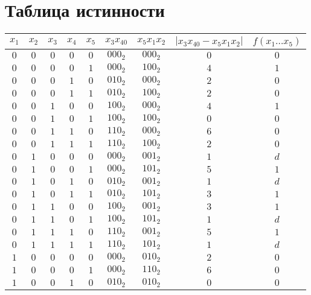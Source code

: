 \documentclass[12pt,a4paper]{report}
\begin{document}
\section*{Таблица истинности}
\begin{tabular}{|ccccc|c|c|c|c|}
    \hline
    $x_1$ & $x_2$ & $x_3$ & $x_4$ & $x_5$ & $x_3x_40$ & $x_5x_1x_2$ & $|x_3x_40-x_5x_1x_2|$ & $f(x_1\dots x_5)$\\
    \hline
    $0$ & $0$ & $0$ & $0$ & $0$ & $000_2$ & $000_2$ & $0$ & $0$\\
    \hline
    $0$ & $0$ & $0$ & $0$ & $1$ & $000_2$ & $100_2$ & $4$ & $1$\\
    \hline
    $0$ & $0$ & $0$ & $1$ & $0$ & $010_2$ & $000_2$ & $2$ & $0$\\
    \hline
    $0$ & $0$ & $0$ & $1$ & $1$ & $010_2$ & $100_2$ & $2$ & $0$\\
    \hline
    $0$ & $0$ & $1$ & $0$ & $0$ & $100_2$ & $000_2$ & $4$ & $1$\\
    \hline
    $0$ & $0$ & $1$ & $0$ & $1$ & $100_2$ & $100_2$ & $0$ & $0$\\
    \hline
    $0$ & $0$ & $1$ & $1$ & $0$ & $110_2$ & $000_2$ & $6$ & $0$\\
    \hline
    $0$ & $0$ & $1$ & $1$ & $1$ & $110_2$ & $100_2$ & $2$ & $0$\\
    \hline
    $0$ & $1$ & $0$ & $0$ & $0$ & $000_2$ & $001_2$ & $1$ & $d$\\
    \hline
    $0$ & $1$ & $0$ & $0$ & $1$ & $000_2$ & $101_2$ & $5$ & $1$\\
    \hline
    $0$ & $1$ & $0$ & $1$ & $0$ & $010_2$ & $001_2$ & $1$ & $d$\\
    \hline
    $0$ & $1$ & $0$ & $1$ & $1$ & $010_2$ & $101_2$ & $3$ & $1$\\
    \hline
    $0$ & $1$ & $1$ & $0$ & $0$ & $100_2$ & $001_2$ & $3$ & $1$\\
    \hline
    $0$ & $1$ & $1$ & $0$ & $1$ & $100_2$ & $101_2$ & $1$ & $d$\\
    \hline
    $0$ & $1$ & $1$ & $1$ & $0$ & $110_2$ & $001_2$ & $5$ & $1$\\
    \hline
    $0$ & $1$ & $1$ & $1$ & $1$ & $110_2$ & $101_2$ & $1$ & $d$\\
    \hline
    $1$ & $0$ & $0$ & $0$ & $0$ & $000_2$ & $010_2$ & $2$ & $0$\\
    \hline
    $1$ & $0$ & $0$ & $0$ & $1$ & $000_2$ & $110_2$ & $6$ & $0$\\
    \hline
    $1$ & $0$ & $0$ & $1$ & $0$ & $010_2$ & $010_2$ & $0$ & $0$\\

\end{tabular}
\end{document}
